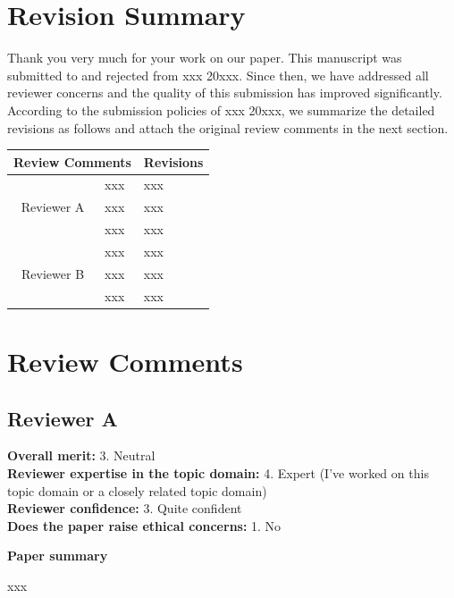 \documentclass{article}
\begin{document}
	
\section{Revision Summary}
Thank you very much for your work on our paper.
This manuscript was submitted to and rejected from xxx 20xxx.
Since then, we have addressed all reviewer concerns and the quality of this submission has improved significantly. 
According to the submission policies of xxx 20xxx, we summarize the detailed revisions as follows and attach the original review comments in the next section.

\begin{longtable}[h]{|p{2cm}p{4.5cm}|p{9cm}|}
		\hline
		\multicolumn{2}{|c|}{\textbf{Review Comments}} & \multicolumn{1}{c|}{\textbf{Revisions}}\\\hline
		\multicolumn{1}{|c|}{\multirow{3}{*}{Reviewer A}} & xxx & xxx\\\cline{2-3}
		\multicolumn{1}{|c|}{} & xxx & xxx\\\cline{2-3}
		\multicolumn{1}{|c|}{} & xxx & xxx\\
		\hline
		\multicolumn{1}{|c|}{\multirow{3}{*}{Reviewer B}} & xxx & xxx\\\cline{2-3}
		\multicolumn{1}{|c|}{} & xxx & xxx\\\cline{2-3}
		\multicolumn{1}{|c|}{} & xxx & xxx\\
		\hline
\end{longtable}

\section{Review Comments}


\subsection{Reviewer A}
\textbf{Overall merit:} 3. Neutral\\
\textbf{Reviewer expertise in the topic domain:} 4. Expert (I've worked on this topic domain or a closely related topic domain)\\
\textbf{Reviewer confidence:} 3. Quite confident\\
\textbf{Does the paper raise ethical concerns:} 1. No

\rule{0pt}{8pt}

\noindent\textbf{Paper summary}

xxx

\rule{0pt}{8pt}
\end{document}
